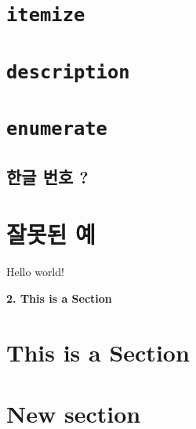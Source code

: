 \documentclass[11pt]{article}
\begin{document}
\tableofcontents

\newpage
\section{\texttt{itemize}}
\section{\texttt{description}}
\section{\texttt{enumerate}}
\subsection{한글 번호 ?}
\section{잘못된 예}
Hello world!

\begin{center}
\textbf{\Large 2. This is a Section}
\end{center}

\section{This is a Section}

\section*{New section}
\end{document}
